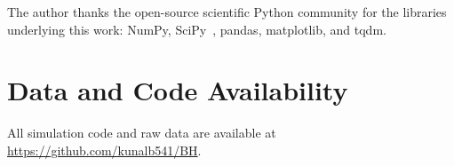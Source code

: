 \documentclass[aps,prresearch,reprint,amsmath,amssymb,longbibliography,floatfix]{revtex4-2}
\begin{document}
\begin{acknowledgments}
The author thanks the open-source scientific Python community for the
libraries underlying this work: NumPy, SciPy~\cite{scipy2020}, pandas,
matplotlib, and tqdm.
\end{acknowledgments}

\section*{Data and Code Availability}

All simulation code and raw data are available at
\href{https://github.com/kunalb541/BH}{https://github.com/kunalb541/BH}.


\end{document}

